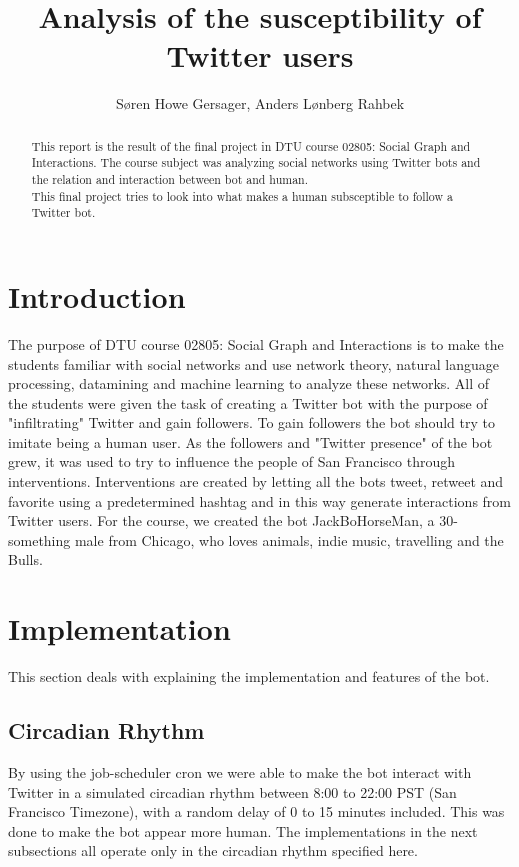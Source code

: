 \documentclass[10pt]{IEEEtran}
\title{Analysis of the susceptibility of Twitter users}
\author{Søren Howe Gersager, Anders Lønberg Rahbek}
\begin{document}
\maketitle

\begin{abstract}
This report is the result of the final project in DTU course 02805: Social Graph and Interactions. The course subject was analyzing social networks using Twitter bots and the relation and interaction between bot and human. \\
This final project tries to look into what makes a human subsceptible to follow a Twitter bot.
\end{abstract}

\section{Introduction}
The purpose of DTU course 02805: Social Graph and Interactions is to make the students familiar with social networks and use network theory, natural language processing, datamining and machine learning to analyze these networks. All of the students were given the task of creating a Twitter bot with the purpose of "infiltrating" Twitter and gain followers. To gain followers the bot should try to imitate being a human user. As the followers and "Twitter presence" of the bot grew, it was used to try to influence the people of San Francisco through interventions. Interventions are created by letting all the bots tweet, retweet and favorite using a predetermined hashtag and in this way generate interactions from Twitter users. For the course, we created the bot JackBoHorseMan\cite{twitterprofile}, a 30-something male from Chicago, who loves animals, indie music, travelling and the Bulls.

\section{Implementation}
This section deals with explaining the implementation and features of the bot.
\subsection{Circadian Rhythm}
By using the job-scheduler cron we were able to make the bot interact with Twitter in a simulated circadian rhythm between 8:00 to 22:00 PST (San Francisco Timezone), with a random delay of 0 to 15 minutes included. This was done to make the bot appear more human.
The implementations in the next subsections all operate only in the circadian rhythm specified here.
\end{document}
